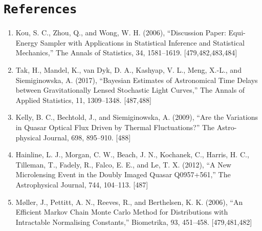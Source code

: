 \documentclass{article}
\begin{document}
\section*{\texttt{References}}
\small
\begin{enumerate}
    \item Kou, S. C., Zhou, Q., and Wong, W. H. (2006), “Discussion Paper:
Equi-Energy Sampler with Applications in Statistical Inference and
Statistical Mechanics,” The Annals of Statistics, 34, 1581–1619.
[479,482,483,484]
\item Tak, H., Mandel, K., van Dyk, D. A., Kashyap, V. L., Meng, X.-L., and
Siemiginowska, A. (2017), “Bayesian Estimates of Astronomical Time
Delays between Gravitationally Lensed Stochastic Light Curves,” The
Annals of Applied Statistics, 11, 1309–1348. [487,488]
\item Kelly, B. C., Bechtold, J., and Siemiginowska, A. (2009), “Are the Variations
in Quasar Optical Flux Driven by Thermal Fluctuations?” The Astro-
physical Journal, 698, 895–910. [488]
\item Hainline, L. J., Morgan, C. W., Beach, J. N., Kochanek, C., Harris, H. C.,
Tilleman, T., Fadely, R., Falco, E. E., and Le, T. X. (2012), “A New
Microlensing Event in the Doubly Imaged Quasar Q0957+561,” The
Astrophysical Journal, 744, 104–113. [487]
\item Møller, J., Pettitt, A. N., Reeves, R., and Berthelsen, K. K. (2006),
“An Efficient Markov Chain Monte Carlo Method for Distributions
with Intractable Normalising Constants,” Biometrika, 93, 451–458.
[479,481,482]
\end{enumerate}
\clearpage
\begin{appendix}
  \listoffigures
  \listoftables
\end{appendix}
\end{document}
